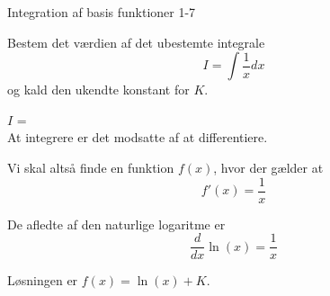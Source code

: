 \documentclass{article}
\begin{document}
\begin{exercise}{Integration af basis funktioner 1-7}

Bestem det værdien af det ubestemte integrale
\[
I = \int \frac{1}{x} dx
\]
og kald den ukendte konstant for $K$.

$I$ =  \\

\hint
At integrere er det modsatte af at differentiere.

\hint
Vi skal altså finde en funktion $f(x)$, hvor der gælder at
\[
f'(x) = \frac{1}{x}
\]

\hint
De afledte af den naturlige logaritme er
\[
\frac{d}{dx} \ln(x) = \frac{1}{x}
\]


\hint
Løsningen er $f(x) = \ln(x) + K$.

\end{exercise}
\end{document}

